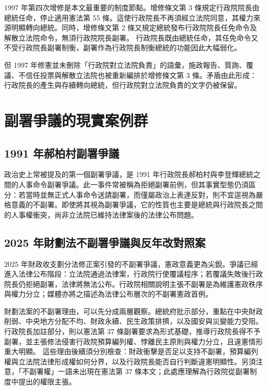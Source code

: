\documentclass[12pt]{ctexart}
\begin{document}
1997 年第四次增修是本文最重要的制度節點。增修條文第 3 條規定行政院院長由總統任命，停止適用憲法第 55 條。這使行政院長不再須經立法院同意，其權力來源明顯轉向總統。同時，增修條文第 2 條又規定總統發布行政院院長任免命令及解散立法院命令，無須行政院院長副署。\autocite{president_fourth_amendment} 行政院長既由總統任命，其任免命令又不受行政院長副署制衡，副署作為行政院長制衡總統的功能因此大幅弱化。

但 1997 年修憲並未刪除「行政院對立法院負責」的語彙，施政報告、質詢、覆議、不信任投票與解散立法院也被重新編排於增修條文第 3 條。矛盾由此形成：行政院長的產生與存續轉向總統，但行政院對立法院負責的文字仍被保留。

\section{副署爭議的現實案例群}

\subsection{1991 年郝柏村副署爭議}

政治史上常被提及的第一個副署爭議，是 1991 年行政院長郝柏村與李登輝總統之間的人事命令副署爭議。此一事件常被稱為拒絕副署前例，但其事實型態仍須區分：若當時並無正式人事命令送請副署，而僅屬政治上表達反對，則不宜逕視為嚴格意義的不副署。即使將其視為副署爭議，它的性質也主要是總統與行政院長之間的人事權衝突，尚非立法院已維持法律案後的法律公布問題。

\subsection{2025 年財劃法不副署爭議與反年改對照案}

2025 年財政收支劃分法修正案引發的不副署爭議，憲政意義更為尖銳。爭議已經進入法律公布階段：立法院通過法律案，行政院行使覆議程序；若覆議失敗後行政院長仍拒絕副署，法律將無法公布。行政院相關說明主張不副署是為維護憲政秩序與權力分立；媒體亦將之描述為法律公布層次的不副署憲政首例。\autocites{ey_finance_countersign_2025}{initium_2025_finance_countersign}

財劃法案的不副署理由，可以先分成兩層觀察。總統府批示部分，重點在中央財政削弱、中央地方分配不均、財政永續、民生政策排擠，以及國安與災變能力受阻。行政院長加註部分，則以憲法第 37 條副署要求為形式基礎，推導行政院長得不予副署，並主張修法侵害行政院預算編列權、悖離民主原則與權力分立，且違憲情形重大明顯。\autocites{president_finance_2025}{ey_finance_unconstitutional_pdf_2025} 這些理由後續須分別檢查：財政衝擊是否足以支持不副署，預算編列權與立法院法律形成權如何分界，以及行政院長能否自行判斷違憲明顯性。另須注意，「不副署權」一語未出現在憲法第 37 條本文；此處應理解為行政院從副署制度中提出的權限主張。
\end{document}

